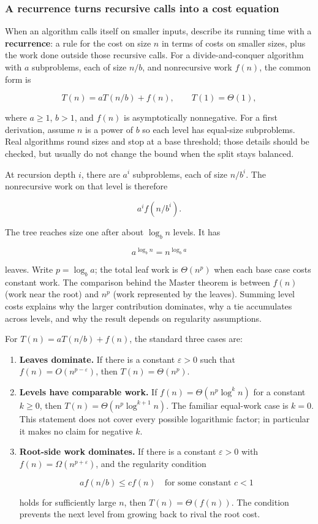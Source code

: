 \subsubsection{A recurrence turns recursive calls into a cost equation}\label{a-recurrence-turns-recursive-calls-into-a-cost-equation}

When an algorithm calls itself on smaller inputs, describe its running time with a \textbf{recurrence}: a rule for the cost on size \(n\) in terms of costs on smaller sizes, plus the work done outside those recursive calls. For a divide-and-conquer algorithm with \(a\) subproblems, each of size \(n/b\), and nonrecursive work \(f(n)\), the common form is

\[
T(n)=aT(n/b)+f(n),\qquad T(1)=\Theta(1),
\]

where \(a\geq1\), \(b>1\), and \(f(n)\) is asymptotically nonnegative. For a first derivation, assume \(n\) is a power of \(b\) so each level has equal-size subproblems. Real algorithms round sizes and stop at a base threshold; those details should be checked, but usually do not change the bound when the split stays balanced.

At recursion depth \(i\), there are \(a^i\) subproblems, each of size \(n/b^i\). The nonrecursive work on that level is therefore

\[
a^i f(n/b^i).
\]

The tree reaches size one after about \(\log_b n\) levels. It has

\[
a^{\log_b n}=n^{\log_b a}
\]

leaves. Write \(p=\log_b a\); the total leaf work is \(\Theta(n^p)\) when each base case costs constant work. The comparison behind the Master theorem is between \(f(n)\) (work near the root) and \(n^p\) (work represented by the leaves). Summing level costs explains why the larger contribution dominates, why a tie accumulates across levels, and why the result depends on regularity assumptions.

For \(T(n)=aT(n/b)+f(n)\), the standard three cases are:

\begin{enumerate}
\def\labelenumi{\arabic{enumi}.}
\item
  \textbf{Leaves dominate.} If there is a constant \(\varepsilon>0\) such that \(f(n)=O(n^{p-\varepsilon})\), then \(T(n)=\Theta(n^p)\).
\item
  \textbf{Levels have comparable work.} If \(f(n)=\Theta(n^p\log^k n)\) for a constant \(k\geq0\), then \(T(n)=\Theta(n^p\log^{k+1}n)\). The familiar equal-work case is \(k=0\). This statement does not cover every possible logarithmic factor; in particular it makes no claim for negative \(k\).
\item
  \textbf{Root-side work dominates.} If there is a constant \(\varepsilon>0\) with \(f(n)=\Omega(n^{p+\varepsilon})\), and the regularity condition

  \[
  a f(n/b)\leq c f(n)\quad\text{for some constant }c<1
  \]

  holds for sufficiently large \(n\), then \(T(n)=\Theta(f(n))\). The condition prevents the next level from growing back to rival the root cost.
\end{enumerate}

